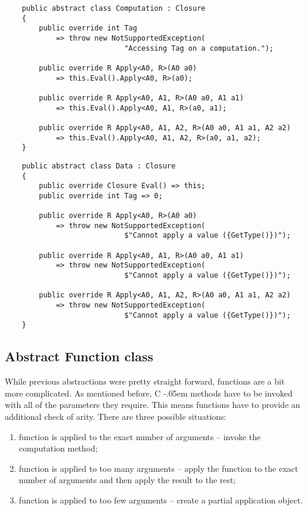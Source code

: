 \documentclass[en]{pracamgr}
\newcommand{\shrp}{%
  {\settoheight{\dimen0}{C}\kern-.05em \resizebox{!}{\dimen0}{\raisebox{\depth}{\textbf{\#}}}\hspace{1ex}}}
\begin{document}
\begin{verbatim}
    public abstract class Computation : Closure
    {
        public override int Tag
            => throw new NotSupportedException(
                            "Accessing Tag on a computation.");

        public override R Apply<A0, R>(A0 a0)
            => this.Eval().Apply<A0, R>(a0);

        public override R Apply<A0, A1, R>(A0 a0, A1 a1)
            => this.Eval().Apply<A0, A1, R>(a0, a1);

        public override R Apply<A0, A1, A2, R>(A0 a0, A1 a1, A2 a2)
            => this.Eval().Apply<A0, A1, A2, R>(a0, a1, a2);
    }
\end{verbatim}
\begin{verbatim}
    public abstract class Data : Closure
    {
        public override Closure Eval() => this;
        public override int Tag => 0;

        public override R Apply<A0, R>(A0 a0)
            => throw new NotSupportedException(
                            $"Cannot apply a value ({GetType()})");

        public override R Apply<A0, A1, R>(A0 a0, A1 a1)
            => throw new NotSupportedException(
                            $"Cannot apply a value ({GetType()})");

        public override R Apply<A0, A1, A2, R>(A0 a0, A1 a1, A2 a2)
            => throw new NotSupportedException(
                            $"Cannot apply a value ({GetType()})");
    }
\end{verbatim}

\newpage
\subsection{Abstract Function class}\label{s:function_class}

While previous abstractions were pretty straight forward,
functions are a bit more complicated. As mentioned before,
C\shrp methods have to be invoked with all of the
parameters they require.
This means functions have to provide an additional check of arity.
There are three possible situations:

\begin{enumerate}
    \item function is applied to the exact number of arguments
    -- invoke the computation method;
    \item function is applied to too many arguments
    -- apply the function to the exact number of arguments
    and then apply the result to the rest;
    \item function is applied to too few arguments 
    -- create a partial application object.
\end{enumerate}
\end{document}
